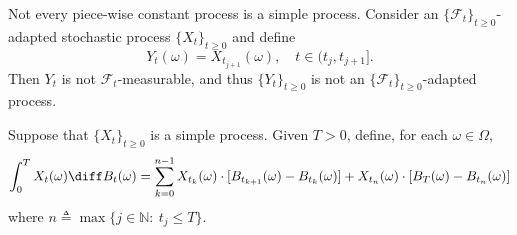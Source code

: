 \begin{remark}
Not every piece-wise constant process is a simple process.
Consider an $\{\mathcal{F}_t\}_{t\ge0}$-adapted stochastic process $\{X_t\}_{t\ge0}$ and define
\[
Y_t(\omega) = X_{t_{j+1}}(\omega),\quad t\in(t_j, t_{j+1}].
\]
Then $Y_t$ is not $\mathcal{F}_t$-measurable, and thus $\{Y_t\}_{t\ge0}$ is not an $\{\mathcal{F}_t\}_{t\ge0}$-adapted process.
\end{remark}

\begin{definition}
Suppose that $\{X_t\}_{t\ge0}$ is a simple process. Given $T>0$, define, for each $\omega\in\Omega$,
\begin{equation}\label{Eq:9:3}
\int_0^TX_t(\omega)\diff B_t(\omega) = \sum_{k=0}^{n-1}X_{t_k}(\omega)\cdot[B_{t_{k+1}}(\omega) -B_{t_k}(\omega)] + X_{t_n}(\omega)\cdot[B_{T}(\omega) -B_{t_n}(\omega)]
\end{equation}
where $n\triangleq\max\{j\in\mathbb{N}:~t_j\le T\}$.
\end{definition}

